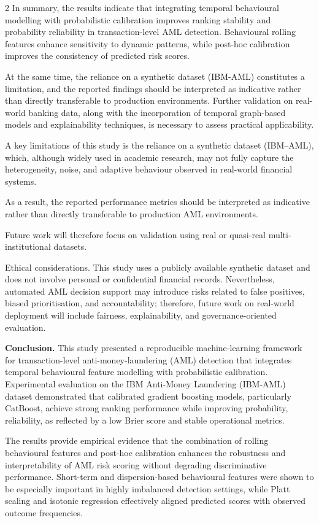 \begin{multicols}{2}
In summary, the results indicate that integrating temporal behavioural
modelling with probabilistic calibration improves ranking stability and
probability reliability in transaction-level AML detection. Behavioural
rolling features enhance sensitivity to dynamic patterns, while post-hoc
calibration improves the consistency of predicted risk scores.

At the same time, the reliance on a synthetic dataset (IBM-AML)
constitutes a limitation, and the reported findings should be
interpreted as indicative rather than directly transferable to
production environments. Further validation on real-world banking data,
along with the incorporation of temporal graph-based models and
explainability techniques, is necessary to assess practical
applicability.

A key limitations of this study is the reliance on a synthetic dataset
(IBM--AML), which, although widely used in academic research, may not
fully capture the heterogeneity, noise, and adaptive behaviour observed
in real-world financial systems.

As a result, the reported performance metrics should be interpreted as
indicative rather than directly transferable to production AML
environments.

Future work will therefore focus on validation using real or quasi-real
multi-institutional datasets.

Ethical considerations. This study uses a publicly available synthetic
dataset and does not involve personal or confidential financial records.
Nevertheless, automated AML decision support may introduce risks related
to false positives, biased prioritisation, and accountability;
therefore, future work on real-world deployment will include fairness,
explainability, and governance-oriented evaluation.

{\bfseries Conclusion.} This study presented a reproducible
machine-learning framework for transaction-level anti-money-laundering
(AML) detection that integrates temporal behavioural feature modelling
with probabilistic calibration. Experimental evaluation on the IBM
Anti-Money Laundering (IBM-AML) dataset demonstrated that calibrated
gradient boosting models, particularly CatBoost, achieve strong ranking
performance while improving probability, reliability, as reflected by a
low Brier score and stable operational metrics.

The results provide empirical evidence that the combination of rolling
behavioural features and post-hoc calibration enhances the robustness
and interpretability of AML risk scoring without degrading
discriminative performance. Short-term and dispersion-based behavioural
features were shown to be especially important in highly imbalanced
detection settings, while Platt scaling and isotonic regression
effectively aligned predicted scores with observed outcome frequencies.


\end{multicols}

